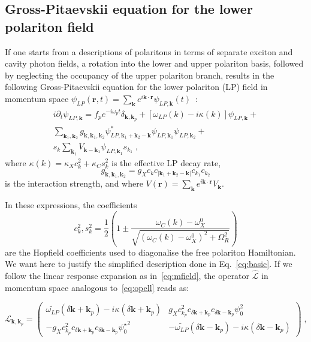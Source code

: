 \begin{subappendices}
\section{Gross-Pitaevskii equation for the lower polariton field}
\label{app:full}
%
If one starts from a descriptions of polaritons in terms of separate
exciton and cavity photon fields, a rotation into the lower and upper
polariton basis, followed by neglecting the occupancy of the upper
polariton branch, results in the following Gross-Pitaevskii equation
for the lower polariton (LP) field in momentum space
$\psi_{LP}(\bm{r},t) = \sum_{\bm{k}} e^{i\bm{k}\cdot \bm{r}}
\psi_{LP,\bm{k}} (t)$~\cite{Ciuti_2003}:
%
\begin{multline}
  i\partial_t \psi_{LP,\bm{k}} = f_p e^{-i\omega_p t}
  \delta_{\bm{k},\bm{k}_p} + \left[\omega_{LP} (k) - i\kappa
    (k)\right]\psi_{LP,\bm{k}} +\\
%
  \sum_{\bm{k}_1, \bm{k}_2} g_{\bm{k}, \bm{k}_1, \bm{k}_2}
  \psi^*_{LP,\bm{k}_1 + \bm{k}_2-\bm{k}} \psi_{LP,\bm{k}_1}
  \psi_{LP,\bm{k}_2} +\\ s_k \sum_{\bm{k}_1} V_{\bm{k} -
    \bm{k}_1} \psi_{LP,\bm{k}_1} s_{k_1}\; ,
\label{eq:efflp}
\end{multline}
%
where $\kappa(k)=\kappa_X c^2_k + \kappa_C s^2_k$ is the effective LP
decay rate,
%
\begin{equation}
  g_{\bm{k}, \bm{k}_1, \bm{k}_2}=g_X c_{k}c_{|\bm{k}_1 + \bm{k}_2-\bm{k}|} c_{k_1} c_{k_2}
\end{equation}
%
is the interaction strength, and where
$V(\bm{r}) = \sum_{\bm{k}} e^{i\bm{k}\cdot \bm{r}} V_{\bm{k}}$.

In these expressions, the coefficients
%
\begin{equation}
  c^2_{k}, s^2_{k} = \frac{1}{2} \left(1 \pm \frac{\omega_C(k) -
    \omega_X^0}{\sqrt{(\omega_C(k) - \omega_X^0)^2 +
      \Omega_R^2}}\right)
\end{equation}
%
are the Hopfield coefficients used to diagonalise the free polariton
Hamiltonian. We want here to justify the simplified description done
in Eq.~\eqref{eq:basic}. If we follow the linear response expansion as
in~\eqref{eq:mfield}, the operator $\hat{\mathcal{L}}$ in momentum
space analogous to~\eqref{eq:opell} reads as:

%
\begin{equation}
  \mathcal{L}_{\bm{k},\bm{k}_p} = \begin{pmatrix}
    \widetilde{\omega_{LP}} (\delta \bm{k}+\bm{k}_p) - i
    \kappa(\delta \bm{k}+\bm{k}_p) & g_X c_{k_p}^2 c_{\delta
      \bm{k}+\bm{k}_p} c_{\delta \bm{k}-\bm{k}_p} \psi_0^2
    \\ - g_X c_{k_p}^2 c_{\delta \bm{k}+\bm{k}_p} c_{\delta
      \bm{k}-\bm{k}_p}{\psi_0^{\star}}^2 & -
    \widetilde{\omega_{LP}}(\delta \bm{k}-\bm{k}_p) -
    i\kappa(\delta \bm{k}-\bm{k}_p) \end{pmatrix}\; ,
\label{eq:opel2}
\end{equation}
%


\end{subappendices}
